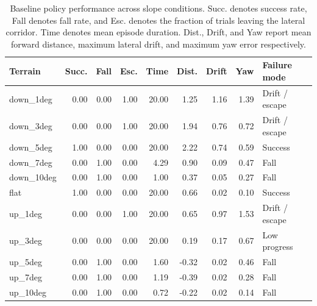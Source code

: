\begin{table}[h]
\centering
\small
\begin{tabular}{lrrrrrrrl}
\hline
Terrain & Succ. & Fall & Esc. & Time & Dist. & Drift & Yaw & Failure mode \\
\hline
down_1deg & 0.00 & 0.00 & 1.00 & 20.00 & 1.25 & 1.16 & 1.39 & Drift / escape \\
down_3deg & 0.00 & 0.00 & 1.00 & 20.00 & 1.94 & 0.76 & 0.72 & Drift / escape \\
down_5deg & 1.00 & 0.00 & 0.00 & 20.00 & 2.22 & 0.74 & 0.59 & Success \\
down_7deg & 0.00 & 1.00 & 0.00 & 4.29 & 0.90 & 0.09 & 0.47 & Fall \\
down_10deg & 0.00 & 1.00 & 0.00 & 1.00 & 0.37 & 0.05 & 0.27 & Fall \\
flat & 1.00 & 0.00 & 0.00 & 20.00 & 0.66 & 0.02 & 0.10 & Success \\
up_1deg & 0.00 & 0.00 & 1.00 & 20.00 & 0.65 & 0.97 & 1.53 & Drift / escape \\
up_3deg & 0.00 & 0.00 & 0.00 & 20.00 & 0.19 & 0.17 & 0.67 & Low progress \\
up_5deg & 0.00 & 1.00 & 0.00 & 1.60 & -0.32 & 0.02 & 0.46 & Fall \\
up_7deg & 0.00 & 1.00 & 0.00 & 1.19 & -0.39 & 0.02 & 0.28 & Fall \\
up_10deg & 0.00 & 1.00 & 0.00 & 0.72 & -0.22 & 0.02 & 0.14 & Fall \\
\hline
\end{tabular}
\caption{Baseline policy performance across slope conditions. Succ. denotes success rate, Fall denotes fall rate, and Esc. denotes the fraction of trials leaving the lateral corridor. Time denotes mean episode duration. Dist., Drift, and Yaw report mean forward distance, maximum lateral drift, and maximum yaw error respectively.}
\label{tab:baseline_slope_results}
\end{table}
